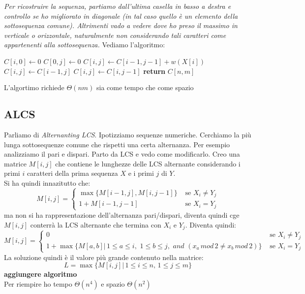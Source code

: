 \documentclass[a4paper,12pt, oneside]{book}
\begin{document}
\textit{Per ricostruire la sequenza, partiamo dall’ultima casella in
  basso a destra e controllo se ho migliorato in diagonale (in tal
  caso quello è un elemento della sottosequenza comune). Altrimenti
  vado a vedere dove ho preso il massimo in verticale o orizzontale,
  naturalmente non considerando tali caratteri come appartenenti alla
  sottosequenza.}
\newpage
Vediamo l'algoritmo:
\begin{shaded}
  \begin{algorithmic}
    \State $C[i,0]\gets 0$
    \EndFor
    \State $C[0,j]\gets 0$
    \EndFor
    \State $C[i,j]\gets C[i-1,j-1]+w(X[i])$
    \Else
    \State $C[i,j]\gets C[i-1,j]$
    \State $C[i,j]\gets C[i, j-1]$
    \EndIf
    \EndIf
    \EndFor
    \EndFor
    \State \textbf{return} $C[n,m]$
    \EndFunction
  \end{algorithmic}
\end{shaded}
L'algortimo richiede $\Theta(nm)$ sia come tempo che come spazio
\subsection{ALCS}
Parliamo di \textit{Alternanting LCS}. Ipotizziamo sequenze
numeriche. Cerchiamo la più lunga sottosequenze comune che rispetti
una certa alternanza. Per esempio analizziamo il pari e dispari.
Parto da LCS e vedo come modificarlo. Creo una matrice $M[i,j]$ che
contiene le lunghezze delle LCS alternante considerando i primi $i$
caratteri della prima sequenza $X$ e i primi $j$ di $Y$.\\
Si ha quindi innazitutto che:
\[ M[i,j]=
  \begin{cases}
    \max\{M[i-1,j], M[i,j-1]\} & \mbox{ se } X_i\neq Y_j\\
    1+M[i-1,j-1] & \mbox{ se } X_i=Y_j
  \end{cases}
\]
ma non si ha rappresentazione dell'alternanza pari/dispari, diventa
quindi cge $M[i,j]$ conterrà la LCS alternante che termina con  $X_i$
e $Y_j$. Diventa quindi:
\[ M[i,j]=
  \begin{cases}
    0 & \mbox{ se } X_i\neq Y_j\\
    1+\max\{M[a,b]|\, 1\leq a \leq i,\,\,1\leq b\leq j,\,\,and\,\,
   (x_a\,mod\, 2 \neq x_b\,mod\, 2)\} & \mbox{ se } X_i=Y_j
  \end{cases}
\]
La soluzione quindi è il valore più grande contenuto nella matrice:
\[L=\max\{M[i,j]|\,1\leq i\leq n,\, 1\leq j\leq m\}\]
\textbf{aggiungere algoritmo}\\
Per riempire ho tempo $\Theta(n^4)$ e spazio $\Theta(n^2)$
\end{document}
